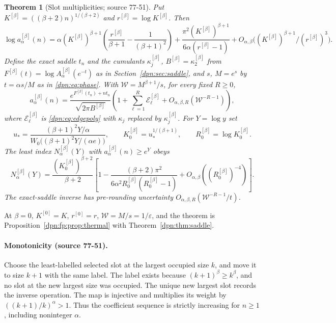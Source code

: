 \documentclass[11pt]{article}
\numberwithin{equation}{section}
\newtheorem{theorem}{Theorem}[section]
\theoremstyle{definition}\newtheorem{definition}[theorem]{Definition}
\theoremstyle{remark}\newtheorem{remark}[theorem]{Remark}
\newcommand{\eps}{\varepsilon}
\newcommand{\src}[1]{\textup{(source #1)}}
\begin{document}
\begin{theorem}[Slot multiplicities; source 77-51]\label{dpn:fp:thm:family}
Put $K^{[\beta]}=((\beta+2)n)^{1/(\beta+2)}$ and $r^{[\beta]}=\log K^{[\beta]}$.  Then
\begin{equation}\label{dpn:fp:eq:familythermal}
 \log a^{[\beta]}_\alpha(n)
 =\alpha (K^{[\beta]})^{\beta+1}\left(\frac{r^{[\beta]}}{\beta+1}-\frac1{(\beta+1)^2}\right)
  +\frac{\pi^2(K^{[\beta]})^{\beta+1}}{6\alpha(r^{[\beta]}-1)}
  +O_{\alpha,\beta}\bigl((K^{[\beta]})^{\beta+1}/(r^{[\beta]})^3\bigr).
\end{equation}
Define the exact saddle $t_n$ and the cumulants $\kappa^{[\beta]}_j$,
$B^{[\beta]}=\kappa^{[\beta]}_2$ from $F^{[\beta]}(t)=\log A^{[\beta]}_\alpha(e^{-t})$
as in Section~\ref{dpn:sec:saddle}, and $s$, $M=e^s$ by $t=\alpha s/M$ as in
\eqref{dpn:eq:phase}.  With $\mathcal W=M^{\beta+1}/s$, for every fixed
$R\ge0$,
\begin{equation}\label{dpn:fp:eq:familysaddle}
 a^{[\beta]}_\alpha(n)=\frac{e^{F^{[\beta]}(t_n)+nt_n}}{\sqrt{2\pi B^{[\beta]}}}
 \left(1+\sum_{\ell=1}^R\mathcal E^{[\beta]}_\ell+O_{\alpha,\beta,R}(\mathcal W^{-R-1})\right),
\end{equation}
where $\mathcal E^{[\beta]}_\ell$ is \eqref{dpn:eq:edgepoly} with $\kappa_j$
replaced by $\kappa^{[\beta]}_j$.  For $Y=\log y$ set
\begin{equation}\label{dpn:fp:eq:familyinvvars}
 u_*=\frac{(\beta+1)^2Y/\alpha}{W_0\bigl((\beta+1)^2Y/(\alpha e)\bigr)},\qquad
 K^{[\beta]}_0=u_*^{1/(\beta+1)},\qquad R^{[\beta]}_0=\log K^{[\beta]}_0.
\end{equation}
The least index $N^{[\beta]}_\alpha(Y)$ with $a^{[\beta]}_\alpha(n)\ge e^Y$ obeys
\begin{equation}\label{dpn:fp:eq:familyinverse}
 N^{[\beta]}_\alpha(Y)=\frac{(K^{[\beta]}_0)^{\beta+2}}{\beta+2}
 \left[1-\frac{(\beta+2)\pi^2}{6\alpha^2R^{[\beta]}_0(R^{[\beta]}_0-1)}
 +O_{\alpha,\beta}((R^{[\beta]}_0)^{-4})\right].
\end{equation}
The exact-saddle inverse has pre-rounding uncertainty
$O_{\alpha,\beta,R}(\mathcal W^{-R-1}/t)$.
\end{theorem}
At $\beta=0$, $K^{[0]}=K$, $r^{[0]}=r$, $\mathcal W=M/s=1/\eps$, and the theorem is
Proposition~\ref{dpn:fp:prop:thermal} with Theorem~\ref{dpn:thm:saddle}.

\paragraph{Monotonicity \src{77-51}.}
Choose the least-labelled selected slot at the largest occupied size $k$, and
move it to size $k+1$ with the same label.  The label exists because
$(k+1)^\beta\ge k^\beta$, and no slot at the new largest size was occupied.
The unique new largest slot records the inverse operation.  The map is
injective and multiplies its weight by $((k+1)/k)^\alpha>1$.  Thus the
coefficient sequence is strictly increasing for $n\ge1$, including
noninteger $\alpha$.
\end{document}
